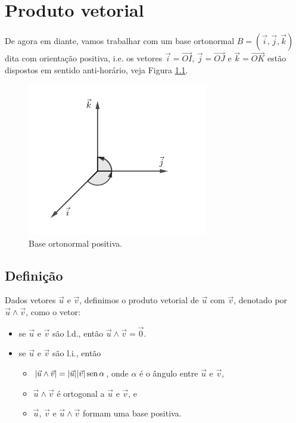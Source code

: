 
\chapter{Produto vetorial}\label{cap_prodvet}
\thispagestyle{fancy}

De agora em diante, vamos trabalhar com um base ortonormal $B = (\vec{i}, \vec{j}, \vec{k})$ dita com orientação positiva, i.e. os vetores $\vec{i} = \overrightarrow{OI}$, $\vec{j} = \overrightarrow{OJ}$ e $\vec{k}=\overrightarrow{OK}$ estão dispostos em sentido anti-horário, veja Figura \ref{fig:base_pos}.

\begin{figure}[H]
  \centering
  \includegraphics[width=0.7\textwidth]{./cap_prodvet/dados/fig_base_pos/fig_base_pos}
  \caption{Base ortonormal positiva.}
  \label{fig:base_pos}
\end{figure}

\section{Definição}\label{cap_prodvet_sec_prodvet}

Dados vetores $\vec{u}$ e $\vec{v}$, definimos o produto vetorial de $\vec{u}$ com $\vec{v}$, denotado por $\vec{u}\land\vec{v}$, como o vetor:
\begin{itemize}
\item se $\vec{u}$ e $\vec{v}$ são l.d., então $\vec{u}\land\vec{v} = \vec{0}$.
\item se $\vec{u}$ e $\vec{v}$ são l.i., então
  \begin{itemize}
  \item $|\vec{u}\land\vec{v}| = |\vec{u}||\vec{v}|\operatorname{sen}\alpha$, onde $\alpha$ é o ângulo entre $\vec{u}$ e $\vec{v}$,
  \item $\vec{u}\land\vec{v}$ é ortogonal a $\vec{u}$ e $\vec{v}$, e
  \item $\vec{u}$, $\vec{v}$ e $\vec{u}\land\vec{v}$ formam uma base positiva.
  \end{itemize}
\end{itemize}

